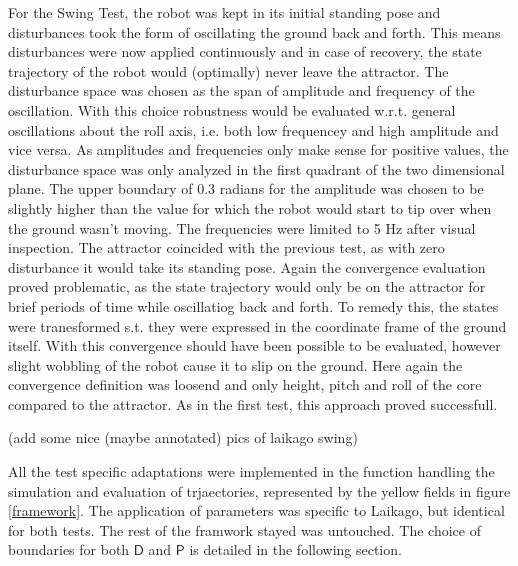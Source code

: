     For the Swing Test, the robot was kept in its initial standing pose and disturbances took the form of oscillating the ground back and forth. This means disturbances were now applied continuously and in case of recovery, the state trajectory of the robot would (optimally) never leave the attractor. The disturbance space was chosen as the span of amplitude and frequency of the oscillation. With this choice robustness would be evaluated w.r.t. general oscillations about the roll axis, i.e. both low frequencey and high amplitude and vice versa. As amplitudes and frequencies only make sense for positive values, the disturbance space was only analyzed in the first quadrant of the two dimensional plane. The upper boundary of $0.3$ radians for the amplitude was chosen to be slightly higher than the value for which the robot would start to tip over when the ground wasn't moving. The frequencies were limited to 5 Hz after visual inspection. 
    The attractor coincided with the previous test, as with zero disturbance it would take its standing pose. 
    Again the convergence evaluation proved problematic, as the state trajectory would only be on the attractor for brief periods of time while oscillatiog back and forth. To remedy this, the states were tranesformed s.t. they were expressed in the coordinate frame of the ground itself. With this convergence should have been possible to be evaluated, however slight wobbling of the robot cause it to slip on the ground. Here again the convergence definition was loosend and only height, pitch and roll of the core compared to the attractor. As in the first test, this approach proved successfull. 

    (add some nice (maybe annotated) pics of laikago swing)

    All the test specific adaptations were implemented in the function handling the simulation and evaluation of trjaectories, represented by the yellow fields in figure \ref{framework}. The application of parameters was specific to Laikago, but identical for both tests. The rest of the framwork stayed was untouched. The choice of boundaries for both $\mathsf{D}$ and $\mathsf{P}$ is detailed in the following section.








    
